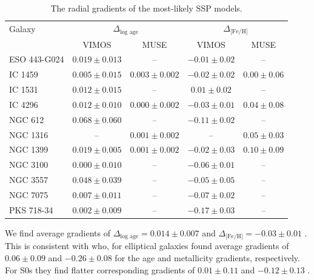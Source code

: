 			\begin{table}
				\centering
				\caption{The radial gradients of the most-likely SSP models.}
				\label{tab:popGrad}
				\begin{tabular}{l c c c c}
					\hline
					\hline 
					Galaxy 	& \multicolumn{2}{c}{$\Delta_\text{log age}$} & \multicolumn{2}{c}{$\Delta_\text{[Fe/H]}$} \\
						& VIMOS & MUSE & VIMOS & MUSE \\
					\hline
					ESO 443-G024 & $0.019 \pm 0.013$ & -- & $-0.01 \pm 0.02$ & -- \\
					IC 1459 	& $0.005 \pm 0.015$ & $0.003 \pm 0.002$ & $-0.02 \pm 0.02$ & $0.00 \pm 0.06$ \\
					IC 1531 	& $0.012 \pm 0.015$ & -- & $0.01 \pm 0.02$ & -- \\
					IC 4296		& $0.012 \pm 0.010$ & $0.000 \pm 0.002$ & $-0.03 \pm 0.01$ & $0.04 \pm 0.08$ \\
					NGC 612 	& $0.068 \pm 0.060$ & -- & $-0.11 \pm 0.02$ & -- \\
					NGC 1316 	& -- & $0.001 \pm 0.002$ & -- &$0.05 \pm 0.03$ \\
					NGC 1399 	& $0.019 \pm 0.005$ & $0.001 \pm 0.002$ & $-0.02 \pm 0.03$ & $0.10 \pm 0.09$ \\
					NGC 3100 	& $0.000 \pm 0.010$ & -- & $-0.06 \pm 0.01$ & -- \\
					NGC 3557 	& $0.048 \pm 0.039$ & -- & $-0.05 \pm 0.05$ & -- \\
					NGC 7075 	& $0.007 \pm 0.011$ & -- & $-0.07 \pm 0.02$ & -- \\
					PKS 718-34  & $0.002 \pm 0.009$ & -- & $-0.17 \pm 0.03$ & -- \\
					\hline
					\hline
				\end{tabular}
			\end{table}

			We find average gradients of $\Delta_\text{log age} = 0.014\pm0.007$%
			 and $\Delta_\text{[Fe/H]} = -0.03\pm0.01$%
			. This is consistent with \citet{Koleva2011} who, for elliptical galaxies found average gradients of $0.06\pm0.09$%
			 and $-0.26\pm0.08$%
			 for the age and metallicity gradients, respectively. For S0s they find flatter corresponding gradients of $0.01\pm0.11$%
			 and $-0.12\pm0.13$%
			. 

